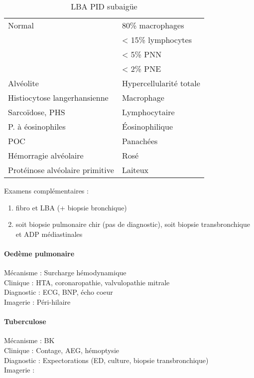 \documentclass[11pt]{article}
\begin{document}
\begin{table}[htbp]
  \caption{LBA PID subaigüe}
  \centering
  \begin{tabular}{ll}
    \toprule
    Normal & 80\% macrophages\\
           & < 15\% lymphocytes\\
           & < 5\% PNN\\
           & < 2\% PNE\\
    \midrule
    Alvéolite & Hypercellularité totale\\
    Histiocytose langerhansienne & Macrophage\\
    Sarcoïdose, PHS & Lymphocytaire\\
    P. à éosinophiles & Éosinophilique\\
    \gls{POC} & Panachées\\
    Hémorragie alvéolaire & Rosé\\
    Protéinose alvéolaire primitive & Laiteux\\
    \bottomrule
  \end{tabular}
\end{table}

Examens complémentaires :
\begin{enumerate}
\item fibro et LBA (+ biopsie bronchique)
\item soit biopsie pulmonaire chir (pas de diagnostic), soit biopsie
transbronchique et ADP médiastinales
\end{enumerate}

\paragraph{Oedème pulmonaire}
\label{sec:orgbf697ba}
Mécanisme : Surcharge hémodynamique\\
Clinique : HTA, coronaropathie, valvulopathie mitrale\\
Diagnostic : ECG, BNP, écho coeur\\
Imagerie : Péri-hilaire

\paragraph{Tuberculose}
\label{sec:org22eeaef}
Mécanisme : BK\\
Clinique : Contage, AEG, hémoptysie\\
Diagnostic : Expectorations (ED, culture, biopsie transbronchique)\\
Imagerie : 
\end{document}
